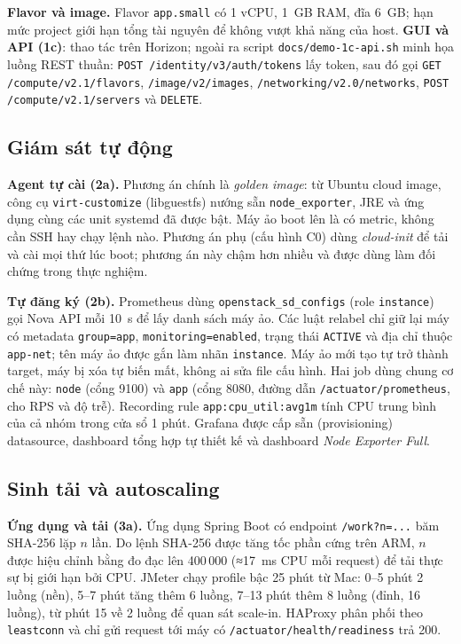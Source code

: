 \documentclass[runningheads]{llncs}
\newcommand{\code}[1]{\texttt{#1}}
\begin{document}
\textbf{Flavor và image.} Flavor \code{app.small} có 1 vCPU, 1~GB RAM, đĩa 6~GB; hạn mức project giới hạn tổng tài nguyên để không vượt khả năng của host. \textbf{GUI và API (1c)}: thao tác trên Horizon; ngoài ra script \code{docs/demo-1c-api.sh} minh họa luồng REST thuần: \code{POST /identity/v3/auth/tokens} lấy token, sau đó gọi \code{GET /compute/v2.1/flavors}, \code{/image/v2/images}, \code{/networking/v2.0/networks}, \code{POST /compute/v2.1/servers} và \code{DELETE}.

\subsection{Giám sát tự động}

\textbf{Agent tự cài (2a).} Phương án chính là \emph{golden image}: từ Ubuntu cloud image, công cụ \code{virt-customize} (libguestfs) nướng sẵn \code{node\_exporter}, JRE và ứng dụng cùng các unit systemd đã được bật. Máy ảo boot lên là có metric, không cần SSH hay chạy lệnh nào. Phương án phụ (cấu hình C0) dùng \emph{cloud-init} để tải và cài mọi thứ lúc boot; phương án này chậm hơn nhiều và được dùng làm đối chứng trong thực nghiệm.

\textbf{Tự đăng ký (2b).} Prometheus dùng \code{openstack\_sd\_configs} (role \code{instance}) gọi Nova API mỗi 10~s để lấy danh sách máy ảo. Các luật relabel chỉ giữ lại máy có metadata \code{group=app}, \code{monitoring=enabled}, trạng thái \code{ACTIVE} và địa chỉ thuộc \code{app-net}; tên máy ảo được gắn làm nhãn \code{instance}. Máy ảo mới tạo tự trở thành target, máy bị xóa tự biến mất, không ai sửa file cấu hình. Hai job dùng chung cơ chế này: \code{node} (cổng 9100) và \code{app} (cổng 8080, đường dẫn \code{/actuator/prometheus}, cho RPS và độ trễ). Recording rule \code{app:cpu\_util:avg1m} tính CPU trung bình của cả nhóm trong cửa sổ 1 phút. Grafana được cấp sẵn (provisioning) datasource, dashboard tổng hợp tự thiết kế và dashboard \emph{Node Exporter Full}.

\subsection{Sinh tải và autoscaling}

\textbf{Ứng dụng và tải (3a).} Ứng dụng Spring Boot có endpoint \code{/work?n=...} băm SHA-256 lặp $n$ lần. Do lệnh SHA-256 được tăng tốc phần cứng trên ARM, $n$ được hiệu chỉnh bằng đo đạc lên 400\,000 (≈17~ms CPU mỗi request) để tải thực sự bị giới hạn bởi CPU. JMeter chạy profile bậc 25 phút từ Mac: 0–5 phút 2 luồng (nền), 5–7 phút tăng thêm 6 luồng, 7–13 phút thêm 8 luồng (đỉnh, 16 luồng), từ phút 15 về 2 luồng để quan sát scale-in. HAProxy phân phối theo \code{leastconn} và chỉ gửi request tới máy có \code{/actuator/health/readiness} trả 200.
\end{document}
